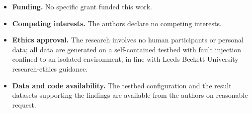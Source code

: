 \documentclass[pdflatex,sn-mathphys-num]{sn-jnl}%
\theoremstyle{thmstyleone}%
\theoremstyle{thmstyletwo}%
\theoremstyle{thmstylethree}%
\begin{document}
\begin{itemize}
\item \textbf{Funding.} No specific grant funded this work.
\item \textbf{Competing interests.} The authors declare no competing interests.
\item \textbf{Ethics approval.} The research involves no human participants or personal data; all data are generated on a self-contained testbed with fault injection confined to an isolated environment, in line with Leeds Beckett University research-ethics guidance.
\item \textbf{Data and code availability.} The testbed configuration and the result datasets supporting the findings are available from the authors on reasonable request.
\end{itemize}
\end{document}

